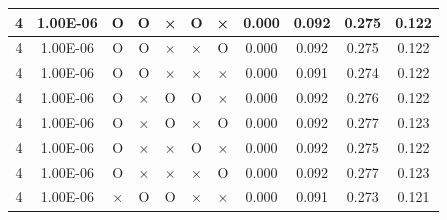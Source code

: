 \documentclass[11pt]{article}
\begin{document}
\begin{longtable}[h]{|r|r|l|l|l|l|l|r|r|l|r|}
\multicolumn{1}{|c|}{4} & \multicolumn{1}{c|}{1.00E-06} & \multicolumn{1}{c|}{O} & \multicolumn{1}{c|}{O} & \multicolumn{1}{c|}{×} & \multicolumn{1}{c|}{O} & \multicolumn{1}{c|}{×} & \multicolumn{1}{c|}{0.000} & \multicolumn{1}{c|}{0.092} & \multicolumn{1}{c|}{0.275} & \multicolumn{1}{c|}{0.122} \\ \hline
\multicolumn{1}{|c|}{4} & \multicolumn{1}{c|}{1.00E-06} & \multicolumn{1}{c|}{O} & \multicolumn{1}{c|}{O} & \multicolumn{1}{c|}{×} & \multicolumn{1}{c|}{×} & \multicolumn{1}{c|}{O} & \multicolumn{1}{c|}{0.000} & \multicolumn{1}{c|}{0.092} & \multicolumn{1}{c|}{0.275} & \multicolumn{1}{c|}{0.122} \\ \hline
\multicolumn{1}{|c|}{4} & \multicolumn{1}{c|}{1.00E-06} & \multicolumn{1}{c|}{O} & \multicolumn{1}{c|}{O} & \multicolumn{1}{c|}{×} & \multicolumn{1}{c|}{×} & \multicolumn{1}{c|}{×} & \multicolumn{1}{c|}{0.000} & \multicolumn{1}{c|}{0.091} & \multicolumn{1}{c|}{0.274} & \multicolumn{1}{c|}{0.122} \\ \hline
\multicolumn{1}{|c|}{4} & \multicolumn{1}{c|}{1.00E-06} & \multicolumn{1}{c|}{O} & \multicolumn{1}{c|}{×} & \multicolumn{1}{c|}{O} & \multicolumn{1}{c|}{O} & \multicolumn{1}{c|}{×} & \multicolumn{1}{c|}{0.000} & \multicolumn{1}{c|}{0.092} & \multicolumn{1}{c|}{0.276} & \multicolumn{1}{c|}{0.122} \\ \hline
\multicolumn{1}{|c|}{4} & \multicolumn{1}{c|}{1.00E-06} & \multicolumn{1}{c|}{O} & \multicolumn{1}{c|}{×} & \multicolumn{1}{c|}{O} & \multicolumn{1}{c|}{×} & \multicolumn{1}{c|}{O} & \multicolumn{1}{c|}{0.000} & \multicolumn{1}{c|}{0.092} & \multicolumn{1}{c|}{0.277} & \multicolumn{1}{c|}{0.123} \\ \hline
\multicolumn{1}{|c|}{4} & \multicolumn{1}{c|}{1.00E-06} & \multicolumn{1}{c|}{O} & \multicolumn{1}{c|}{×} & \multicolumn{1}{c|}{×} & \multicolumn{1}{c|}{O} & \multicolumn{1}{c|}{×} & \multicolumn{1}{c|}{0.000} & \multicolumn{1}{c|}{0.092} & \multicolumn{1}{c|}{0.275} & \multicolumn{1}{c|}{0.122} \\ \hline
\multicolumn{1}{|c|}{4} & \multicolumn{1}{c|}{1.00E-06} & \multicolumn{1}{c|}{O} & \multicolumn{1}{c|}{×} & \multicolumn{1}{c|}{×} & \multicolumn{1}{c|}{×} & \multicolumn{1}{c|}{O} & \multicolumn{1}{c|}{0.000} & \multicolumn{1}{c|}{0.092} & \multicolumn{1}{c|}{0.277} & \multicolumn{1}{c|}{0.123} \\ \hline
\multicolumn{1}{|c|}{4} & \multicolumn{1}{c|}{1.00E-06} & \multicolumn{1}{c|}{×} & \multicolumn{1}{c|}{O} & \multicolumn{1}{c|}{O} & \multicolumn{1}{c|}{×} & \multicolumn{1}{c|}{×} & \multicolumn{1}{c|}{0.000} & \multicolumn{1}{c|}{0.091} & \multicolumn{1}{c|}{0.273} & \multicolumn{1}{c|}{0.121} \\ \hline

\end{longtable}
\end{document}
